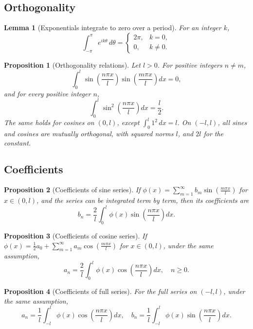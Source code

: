 \documentclass{article}
\newtheorem{lemma}[theorem]{Lemma}
\newtheorem{proposition}{Proposition}
\begin{document}
\subsection{Orthogonality}
\begin{lemma}[Exponentials integrate to zero over a period]
    For an integer $k$,
    \[\int_{-\pi}^\pi e^{ik\theta}\,d\theta = \begin{cases}2\pi, & k=0,\\0, & k\neq0.\end{cases}\]
\end{lemma}
\begin{proposition}[Orthogonality relations]
    Let $l>0$. For positive integers $n\neq m$,
    \[\int_0^l\sin\left(\frac{n\pi x}{l}\right)\sin\left(\frac{m\pi x}{l}\right)dx=0,\]
    and for every positive integer $n$,
    \[\int_0^l\sin^2\left(\frac{n\pi x}{l}\right)dx = \frac{l}{2}.\]
    The same holds for cosines on $(0,l)$, except $\int_0^l 1^2\,dx = l$. On $(-l,l)$, all sines and cosines are mutually orthogonal, with squared norms $l$, and $2l$ for the constant.
\end{proposition}

\subsection{Coefficients}
\begin{proposition}[Coefficients of sine series]
    If $\phi(x) = \sum_{m=1}^\infty b_m\sin\left(\frac{m\pi x}{l}\right)$ for $x\in(0,l)$, and the series can be integrated term by term, then its coefficients are
    \begin{equation}
        \label{eq:sine-coeff}
        b_n = \frac{2}{l}\int_0^l\phi(x)\sin\left(\frac{n\pi x}{l}\right)dx.
    \end{equation}
\end{proposition}
\begin{proposition}[Coefficients of cosine series]
    If $\phi(x) = \frac{1}{2}a_0+\sum_{m=1}^\infty a_m\cos\left(\frac{m\pi x}{l}\right)$ for $x\in(0,l)$, under the same assumption,
    \begin{equation}
        \label{eq:cosine-coeff}
        a_n = \frac{2}{l}\int_0^l \phi(x)\cos\left(\frac{n\pi x}{l}\right)dx,\quad n\geq0.
    \end{equation}
\end{proposition}
\begin{proposition}[Coefficients of full series]
    For the full series on $(-l,l)$, under the same assumption,
    \begin{equation}
        \label{eq:full-coeff}
        a_n = \frac{1}{l}\int_{-l}^l \phi(x)\cos\left(\frac{n\pi x}{l}\right)dx,\quad b_n = \frac{1}{l}\int_{-l}^l \phi(x)\sin\left(\frac{n\pi x}{l}\right)dx.
    \end{equation}
\end{proposition}
\end{document}
